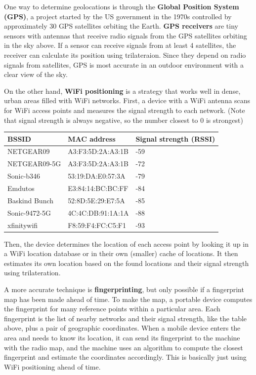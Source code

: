 \documentclass{article}
\newcounter{algo}[section]
\begin{document}
  One way to determine geolocations is through the \textbf{Global Position System (GPS)}, a project started by the US government in the 1970s controlled by approximately 30 GPS satellites orbiting the Earth. \textbf{GPS receivers} are tiny sensors with antennas that receive radio signals from the GPS satellites orbiting in the sky above. If a sensor can receive signals from at least 4 satellites, the receiver can calculate its position using trilateraion. Since they depend on radio signals from satellites, GPS is most accurate in an outdoor environment with a clear view of the sky. 

  On the other hand, \textbf{WiFi positioning} is a strategy that works well in dense, urban areas filled with WiFi networks. First, a device with a WiFi antenna scans for WiFi access points and measures the signal strength to each network. (Note that signal strength is always negative, so the number closest to 0 is strongest)
  \begin{center}
  \begin{tabular}{l|l|l}
      BSSID & MAC address & Signal strength (RSSI) \\
      \hline
      NETGEAR09 & A3:F3:5D:2A:A3:1B & -59 \\
      NETGEAR09-5G & A3:F3:5D:2A:A3:1B & -72 \\
      Sonic-b346 & 53:19:DA:E0:57:3A & -79 \\
      Emdutos & E3:84:14:BC:BC:FF & -84 \\
      Baskind Bunch & 52:8D:5E:29:E7:5A & -85 \\
      Sonic-9472-5G & 4C:4C:DB:91:1A:1A & -88 \\
      xfinitywifi & F8:59:F4:FC:C5:F1	& -93
  \end{tabular}
  \end{center}
  Then, the device determines the location of each access point by looking it up in a WiFi location database or in their own (smaller) cache of locations. It then estimates its own location based on the found locations and their signal strength using trilateration. 

  A more accurate technique is \textbf{fingerprinting}, but only possible if a fingerprint map has been made ahead of time. To make the map, a portable device computes the fingerprint for many reference points within a particular area. Each fingerprint is the list of nearby networks and their signal strength, like the table above, plus a pair of geographic coordinates. When a mobile device enters the area and needs to know its location, it can send its fingerprint to the machine with the radio map, and the machine uses an algorithm to compute the closest fingerprint and estimate the coordinates accordingly. This is basically just using WiFi positioning ahead of time. 
\end{document}
